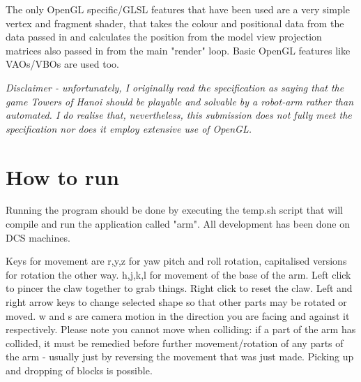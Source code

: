 \documentclass[titlepage]{article}
\begin{document}
    The only OpenGL specific/GLSL features that have been used are a very simple vertex and fragment shader, that takes the colour and positional data from the data passed in and calculates the position from the model view projection matrices also passed in from the main "render" loop. Basic OpenGL features like VAOs/VBOs are used too.

    \textit{Disclaimer - unfortunately, I originally read the specification as saying that the game Towers of Hanoi should be playable and solvable by a robot-arm rather than automated. I do realise that, nevertheless, this submission does not fully meet the specification nor does it employ extensive use of OpenGL.}

\section*{How to run}

    Running the program should be done by executing the temp.sh script that will compile and run the application called "arm". All development has been done on DCS machines.

    Keys for movement are r,y,z for yaw pitch and roll rotation, capitalised versions for rotation the other way. h,j,k,l for movement of the base of the arm. Left click to pincer the claw together to grab things. Right click to reset the claw. Left and right arrow keys to change selected shape so that other parts may be rotated or moved. w and s are camera motion in the direction you are facing and against it respectively. Please note you cannot move when colliding: if a part of the arm has collided, it must be remedied before further movement/rotation of any parts of the arm - usually just by reversing the movement that was just made. Picking up and dropping of blocks is possible.



\end{document}
